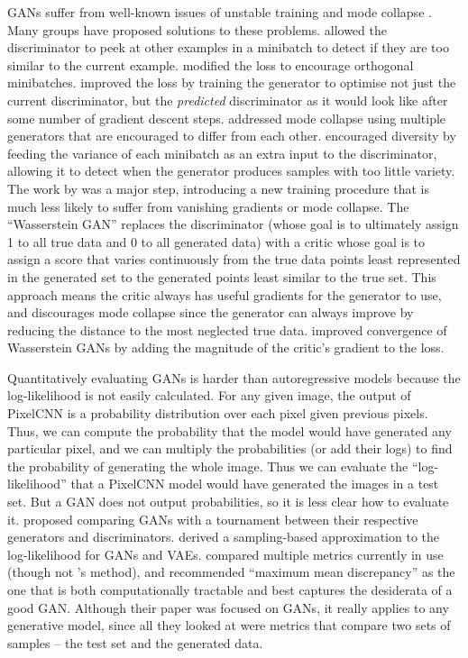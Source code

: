 \documentclass[11pt, a4paper, openany]{book}
\newcommand{\nquote}[1]{``{#1}''}
\begin{document}
GANs suffer from well-known issues of unstable training and mode collapse \citep{gantechniques}. Many groups have proposed solutions to these problems. \citet{gantechniques} allowed the discriminator to peek at other examples in a minibatch to detect if they are too similar to the current example. \citet{energygan} modified the loss to encourage orthogonal minibatches. \citet{unrolledgan} improved the loss by training the generator to optimise not just the current discriminator, but the \emph{predicted} discriminator as it would look like after some number of gradient descent steps. \citet{multiagentgan} addressed mode collapse using multiple generators that are encouraged to differ from each other. \citet{progressivegrowing} encouraged diversity by feeding the variance of each minibatch as an extra input to the discriminator, allowing it to detect when the generator produces samples with too little variety. The work by \citet{wgan} was a major step, introducing a new training procedure that is much less likely to suffer from vanishing gradients or mode collapse. The \nquote{Wasserstein GAN} replaces the discriminator (whose goal is to ultimately assign 1 to all true data and 0 to all generated data) with a critic whose goal is to assign a score that varies continuously from the true data points least represented in the generated set to the generated points least similar to the true set. This approach means the critic always has useful gradients for the generator to use, and discourages mode collapse since the generator can always improve by reducing the distance to the most neglected true data. \citet{improvedwgans} improved convergence of Wasserstein GANs by adding the magnitude of the critic's gradient to the loss.

Quantitatively evaluating GANs is harder than autoregressive models because the log-likelihood is not easily calculated. For any given image, the output of PixelCNN is a probability distribution over each pixel given previous pixels. Thus, we can compute the probability that the model would have generated any particular pixel, and we can multiply the probabilities (or add their logs) to find the probability of generating the whole image. Thus we can evaluate the \nquote{log-likelihood} that a PixelCNN model would have generated the images in a test set. But a GAN does not output probabilities, so it is less clear how to evaluate it. \citet{gantournament} proposed comparing GANs with a tournament between their respective generators and discriminators. \citet{likelihoodestimation} derived a sampling-based approximation to the log-likelihood for GANs and VAEs. \citet{ganmetrics} compared multiple metrics currently in use (though not \citet{likelihoodestimation}'s method), and recommended \nquote{maximum mean discrepancy} \citep{mmd} as the one that is both computationally tractable and best captures the desiderata of a good GAN. Although their paper was focused on GANs, it really applies to any generative model, since all they looked at were metrics that compare two sets of samples -- the test set and the generated data.
\end{document}
